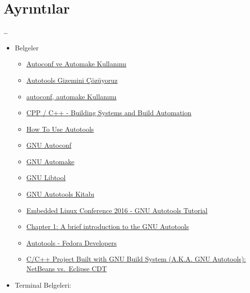 \documentclass[
]{book}
\newenvironment{Shaded}{\begin{snugshade}}{\end{snugshade}}
\newcommand{\ExtensionTok}[1]{#1}
\newcommand{\NormalTok}[1]{#1}
\newcommand{\VariableTok}[1]{\textcolor[rgb]{0.00,0.00,0.00}{#1}}
\providecommand{\tightlist}{%
  \setlength{\itemsep}{0pt}\setlength{\parskip}{0pt}}
\begin{document}
\begin{Shaded}
\end{Shaded}

\hypertarget{ayrux131ntux131lar-2}{%
\section*{Ayrıntılar}\label{ayrux131ntux131lar-2}}

\ldots{}

\begin{itemize}
\item
  Belgeler

  \begin{itemize}
  \tightlist
  \item
    \href{http://www.belgeler.org/howto/makefile-nasil-autoconf_automake.html}{Autoconf ve Automake Kullanımı}
  \item
    \href{https://ysar.net/yazilim-dunyasi/autotools.html}{Autotools Gizemini Çözüyoruz}
  \item
    \href{https://demirten.gitbooks.io/gomulu-linux/content/gnubuild/autoconf.html}{autoconf, automake Kullanımı}
  \item
    \href{https://caiorss.github.io/C-Cpp-Notes/building-systems.html}{CPP / C++ - Building Systems and Build Automation}
  \item
    \href{https://eklitzke.org/how-to-autotools}{How To Use Autotools}
  \item
    \href{https://www.gnu.org/software/autoconf/}{GNU Autoconf}
  \item
    \href{https://www.gnu.org/software/automake/automake.html}{GNU Automake}
  \item
    \href{https://www.gnu.org/software/libtool/libtool.html}{GNU Libtool}
  \item
    \href{https://www.gnu.org/software/autoconf/manual}{GNU Autotools Kitabı}
  \item
    \href{https://elinux.org/images/4/43/Petazzoni.pdf}{Embedded Linux Conference 2016 - GNU Autotools Tutorial}
  \item
    \href{http://freesoftwaremagazine.com/articles/brief_introduction_to_gnu_autotools/}{Chapter 1: A brief introduction to the GNU Autotools}
  \item
    \href{https://developer.fedoraproject.org/tech/languages/c/autotools.html}{Autotools - Fedora Developers}
  \item
    \href{http://thegreyblog.blogspot.com/2013/09/cc-project-built-with-gnu-build-system.html}{C/C++ Project Built with GNU Build System (A.K.A. GNU Autotools): NetBeans vs.~Eclipse CDT}
  \end{itemize}
\item
  Terminal Belgeleri:


\end{itemize}
\end{document}
